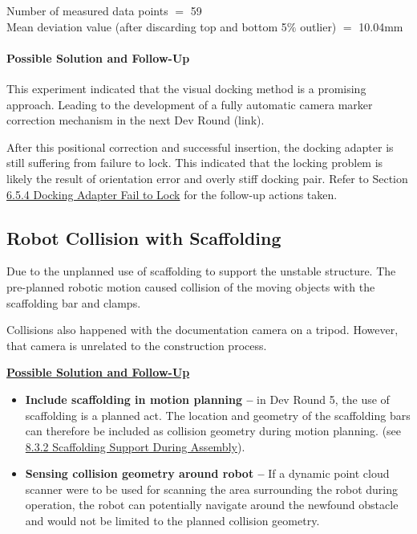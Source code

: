 {

{\footnotesize Number of measured data points $=$ 59 \\ Mean deviation value (after discarding top and bottom 5$\%$ outlier) $=$ 10.04mm\par}

\paragraph{Possible Solution and Follow-Up}

This experiment indicated that the visual docking method is a promising approach. Leading to the development of a fully automatic camera marker correction mechanism in the next Dev Round (link). 

After this positional correction and successful insertion, the docking adapter is still suffering from failure to lock. This indicated that the locking problem is likely the result of orientation error and overly stiff docking pair. Refer to Section\ul{ 6.5.4 Docking Adapter Fail to Lock} for the follow-up actions taken.

\subsection{Robot Collision with Scaffolding}

Due to the unplanned use of scaffolding to support the unstable structure. The pre-planned robotic motion caused collision of the moving objects with the scaffolding bar and clamps. 






Collisions also happened with the documentation camera on a tripod. However, that camera is unrelated to the construction process.

\textbf{\ul{Possible Solution and Follow-Up}}

\begin{itemize}
	\item \textbf{Include scaffolding in motion planning --} in Dev Round 5, the use of scaffolding is a planned act. The location and geometry of the scaffolding bars can therefore be included as collision geometry during motion planning. (see \ul{8.3.2 Scaffolding Support During Assembly}).

	\item \textbf{Sensing collision geometry around robot --} If a dynamic point cloud scanner were to be used for scanning the area surrounding the robot during operation, the robot can potentially navigate around the newfound obstacle and would not be limited to the planned collision geometry. 


\end{itemize}}
